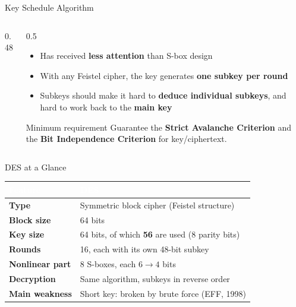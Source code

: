 \documentclass[aspectratio=169,11pt,xcolor={table}]{beamer}
\begin{document}
\begin{frame}{Key Schedule Algorithm}
  \begin{columns}[c]
    \begin{column}{0.48\textwidth}
      \centering
    \end{column}
    \begin{column}{0.5\textwidth}
      \begin{itemize}\small\setlength{\itemsep}{4pt}
        \item Has received \textbf{less attention} than S-box design
        \item With any Feistel cipher, the key generates \textbf{one subkey per round}
        \item Subkeys should make it hard to \textbf{deduce individual subkeys}, and hard to work back to the \textbf{main key}
      \end{itemize}
      \begin{block}{Minimum requirement}
        \small Guarantee the \textbf{Strict Avalanche Criterion} and the \textbf{Bit Independence Criterion} for key/ciphertext.
      \end{block}
    \end{column}
  \end{columns}
\end{frame}

\begin{frame}{DES at a Glance}
  \centering
  \renewcommand{\arraystretch}{1.45}
  \begin{tabular}{>{\bfseries}l l}
    \toprule
    \rowcolor{navy}\textcolor{white}{Feature} & \textcolor{white}{\textbf{DES}}\\
    \midrule
    Type & Symmetric block cipher (Feistel structure)\\
    Block size & 64 bits\\
    Key size & 64 bits, of which \textbf{56} are used (8 parity bits)\\
    Rounds & 16, each with its own 48-bit subkey\\
    Nonlinear part & 8 S-boxes, each $6 \rightarrow 4$ bits\\
    Decryption & Same algorithm, subkeys in reverse order\\
    Main weakness & Short key: broken by brute force (EFF, 1998)\\
    \bottomrule
  \end{tabular}
\end{frame}
\end{document}
